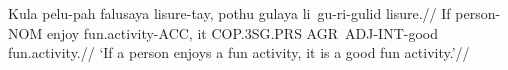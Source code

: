 \ex
\begingl
    \gla Kula pelu-pah   falusaya lisure-tay,       pothu gulaya      li~gu-ri-gulid   lisure.//
    \glb If   person-NOM enjoy    fun.activity-ACC, it    COP.3SG.PRS AGR~ADJ-INT-good fun.activity.//
    \glft `If a person enjoys a fun activity, it is a good fun activity.'//
\endgl
\xe

